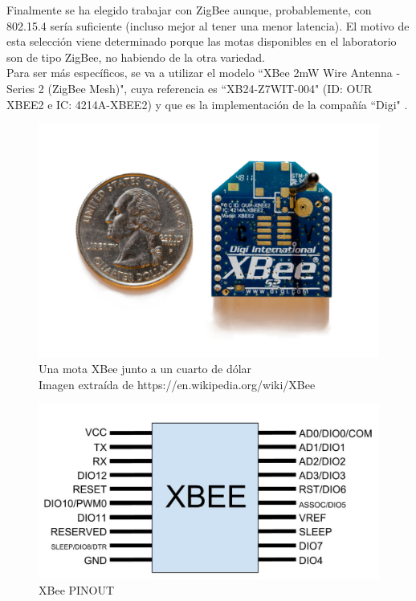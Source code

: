 Finalmente se ha elegido trabajar con ZigBee aunque, probablemente, con 802.15.4 sería suficiente (incluso
mejor al tener una menor latencia). El motivo de esta selección viene determinado porque las motas disponibles
en el laboratorio son de tipo ZigBee, no habiendo de la otra variedad.\\

Para ser más específicos, se va a utilizar el modelo ``XBee 2mW Wire Antenna - Series 2 (ZigBee Mesh)", cuya referencia es
``XB24-Z7WIT-004" (ID: OUR XBEE2 e IC: 4214A-XBEE2) y que es la implementación de la compañía ``Digi" \cite{productdetaildigi}.


\begin{figure}[htb]
\centering
\captionsetup{justification=centering}
\includegraphics[width=1\textwidth]{./imagenes/xbeequarter}
\caption{Una mota XBee junto a un cuarto de dólar\\
\scriptsize{Imagen extraída de https://en.wikipedia.org/wiki/XBee} } \label{fig:xbeequarter}
\end{figure}

\begin{figure}[htb]
\centering
\includegraphics[width=1\textwidth]{./imagenes/xbeepinout}
\caption{XBee PINOUT} \label{fig:xbeepinout}
\end{figure}

